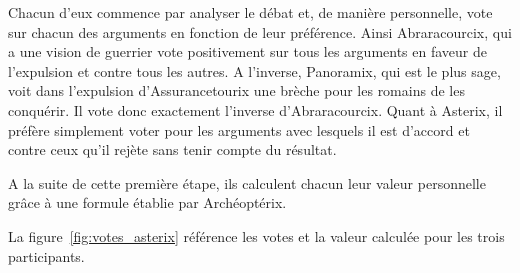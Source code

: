 \documentclass[11pt]{article}
\theoremstyle{defi}
\theoremstyle{not}
\theoremstyle{prob}
\begin{document}
      Chacun d'eux commence par analyser le débat et, de manière personnelle, vote sur chacun des arguments en fonction de leur préférence.
      Ainsi Abraracourcix, qui a une vision de guerrier vote positivement sur tous les arguments en faveur de l'expulsion et contre tous les autres.
      A l'inverse, Panoramix, qui est le plus sage, voit dans l'expulsion d'Assurancetourix une brèche pour les romains de les conquérir. Il vote donc exactement l'inverse d'Abraracourcix.
      Quant à Asterix, il préfère simplement voter pour les arguments avec lesquels il est d'accord et contre ceux qu'il rejète sans tenir compte du résultat.

      A la suite de cette première étape, ils calculent chacun leur valeur personnelle grâce à une formule établie par Archéoptérix.

      La figure~\ref{fig:votes_asterix} référence les votes et la valeur calculée pour les trois participants.
\end{document}
